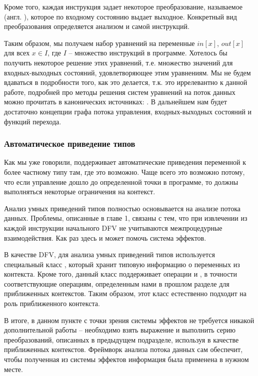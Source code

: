 Кроме того, каждая инструкция задает некоторое преобразование, называемое  (англ. ), которое по входному состоянию выдает выходное. Конкретный вид преобразования определяется анализом и самой инструкций. 

Таким образом, мы получаем набор уравнений на переменные $in[x]$, $out[x]$ для всех $x \in I$, где $I$ -- множество инструкций в программе. Хотелось бы получить некоторое решение этих уравнений, т.е. множество значений для входных-выходных состояний, удовлетворяющее этим уравнениям. Мы не будем вдаваться в подробности того, как это делается, т.к. это иррелевантно к данной работе, подробней про методы решения систем уравнений на поток данных можно прочитать в канонических источниках: \cite{dragon-book, muchnick}. В дальнейшем нам будет достаточно концепции графа потока управления, входных-выходных состояний и функций перехода.

\subsubsection{Автоматическое приведение типов}

\label{section-upgrading-smartcasts}

Как мы уже говорили,  поддерживает автоматические приведения переменной к более частному типу там, где это возможно. Чаще всего это возможно потому, что если управление дошло до определенной точки в программе, то должны выполняться некоторые ограничения на контекст.

Анализ умных приведений типов полностью основывается на анализе потока данных. Проблемы, описанные в главе 1, связаны с тем, что при извлечении из каждой инструкции начального DFV не учитываются межпроцедурные взаимодействия. Как раз здесь и может помочь система эффектов.

В качестве DFV, для анализа умных приведений типов используется специальный класс , который хранит типовую информацию о переменных из контекста. Кроме того, данный класс поддерживает операции  и , в точности соответствующие операциям, определенным нами в прошлом разделе для приближенных контекстов. Таким образом, этот класс естественно подходит на роль приближенного контекста.

В итоге, в данном пункте с точки зрения системы эффектов не требуется никакой дополнительной работы -- необходимо взять выражение и выполнить серию преобразований, описанных в предыдущем подразделе, используя  в качестве приближенных контекстов. Фреймворк анализа потока данных сам обеспечит, чтобы полученная из системы эффектов информация была применена в нужном месте.


